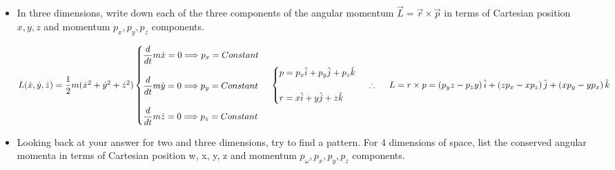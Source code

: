 \documentclass[fleqn]{article}
\begin{document}
\begin{enumerate}
\begin{itemize}
      \item In three dimensions, write down each of the three components of
      the angular momentum $\overrightarrow{L}=\overrightarrow{r} \times \overrightarrow{p}$ in terms of Cartesian position
      $x,y,z$ and momentum $p_x, p_y, p_z$ components.

        \textcolor{hwColor}{
          $
            L(\dot{x}, \dot{y}, \dot{z})=\dfrac{1}{2}m (\dot{x}^2+\dot{y}^2+\dot{z}^2)
            \\
            \\
            \begin{cases}
              \dfrac{d}{dt}m \dot{x}=0 \Longrightarrow p_x=Constant
              \\
              \\
              \dfrac{d}{dt}m \dot{y}=0 \Longrightarrow p_y=Constant
              \\
              \\
              \dfrac{d}{dt}m \dot{z}=0 \Longrightarrow p_z=Constant
            \end{cases}
            \\
            \\
            \\
            \begin{cases}
              p=p_x \hat{i}+p_y \hat{j}+p_z \hat{k}
              \\
              \\
              r=x \hat{i}+y \hat{j}+z \hat{k}
            \end{cases}
            \\
            \\
            \\
            \therefore ~~~~ L=r \times p=\left(p_y z-p_z y\right) \hat{i}+\left(z p_x-x p_z\right) \hat{j}+\left(x p_y-y p_x\right) \hat{k}
          $
        }

      \item Looking back at your answer for two and three dimensions, try
      to find a pattern. For 4 dimensions of space, list the conserved
      angular momenta in terms of Cartesian position w, x, y, z and momentum $p_{\omega}, p_x, p_y,p_z$ components.


\end{itemize}
\end{enumerate}
\end{document}
